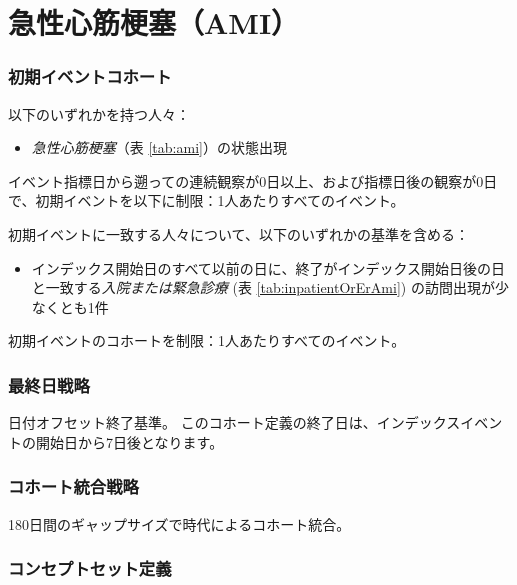 \documentclass[
  11pt]{book}
\providecommand{\tightlist}{%
  \setlength{\itemsep}{0pt}\setlength{\parskip}{0pt}}
\theoremstyle{definition}
\theoremstyle{definition}
\theoremstyle{definition}
\theoremstyle{definition}
\theoremstyle{remark}
\begin{document}
\section{急性心筋梗塞（AMI）}\label{Ami}

\subsubsection*{初期イベントコホート}\label{ux521dux671fux30a4ux30d9ux30f3ux30c8ux30b3ux30dbux30fcux30c8-2}

以下のいずれかを持つ人々：

\begin{itemize}
\tightlist
\item
  \emph{急性心筋梗塞}（表 \ref{tab:ami}）の状態出現
\end{itemize}

イベント指標日から遡っての連続観察が0日以上、および指標日後の観察が0日で、初期イベントを以下に制限：1人あたりすべてのイベント。

初期イベントに一致する人々について、以下のいずれかの基準を含める：

\begin{itemize}
\tightlist
\item
  インデックス開始日のすべて以前の日に、終了がインデックス開始日後の日と一致する\emph{入院または緊急診療} (表 \ref{tab:inpatientOrErAmi}) の訪問出現が少なくとも1件
\end{itemize}

初期イベントのコホートを制限：1人あたりすべてのイベント。

\subsubsection*{最終日戦略}\label{ux6700ux7d42ux65e5ux6226ux7565-2}

日付オフセット終了基準。
このコホート定義の終了日は、インデックスイベントの開始日から7日後となります。

\subsubsection*{コホート統合戦略}\label{ux30b3ux30dbux30fcux30c8ux7d71ux5408ux6226ux7565-2}

180日間のギャップサイズで時代によるコホート統合。

\subsubsection*{コンセプトセット定義}\label{ux30b3ux30f3ux30bbux30d7ux30c8ux30bbux30c3ux30c8ux5b9aux7fa9-2}
\end{document}
